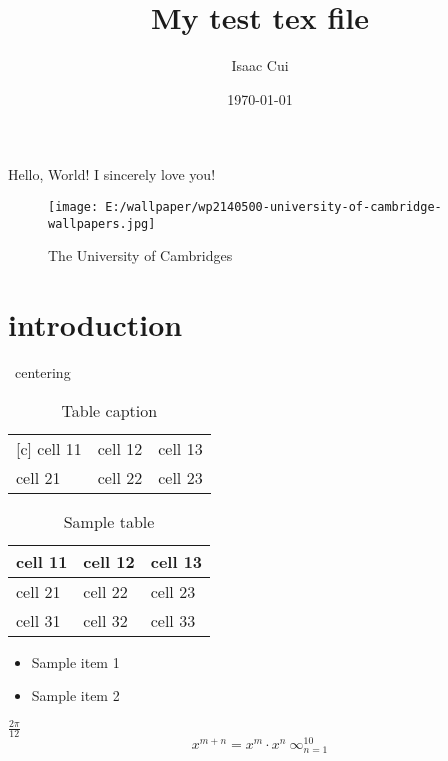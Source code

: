 \documentclass[a4paper,13pt]{book}
\title{My test tex file}
\author{Isaac Cui }
\date{\today}
\begin{document}
\maketitle
	Hello, World!
	I sincerely love you! 

\begin{figure}[H]
\centering
\texttt{[image: E:/wallpaper/wp2140500-university-of-cambridge-wallpapers.jpg]}
\caption{The University of Cambridges}
\label{figure1}
\end{figure}

\section{introduction}
\begin{table} [!ht]
\ centering
	\begin{tabular}{ l l l }[c]
 		 cell 11 & cell 12 & cell 13 \\
		 cell 21 & cell 22 & cell 23 \\
 	\end{tabular}
 \caption{Table caption}
 \label { tab:myspstable}
 \end{table}

\begin{table} [ !ht ]
 \centering
 \begin{tabular}{p{2cm} |p{3cm}p{3cm} }
 cell 11 & cell 12 & cell 13 \\ \hline
 cell 21 & cell 22 & cell 23 \\
 cell 31 & cell 32 & cell 33
 \end{tabular}
 \caption{Sample table }
 \label { tab:myspstable1}
 \end{table}

\begin{itemize}
 \item Sample item 1
 \item Sample item 2
\end{itemize}


$\frac{2\pi}{12}$
$$ x^{m+n} = x^m \cdot x^n \ \infty_{n=1}^{10}$$
\end{document}
